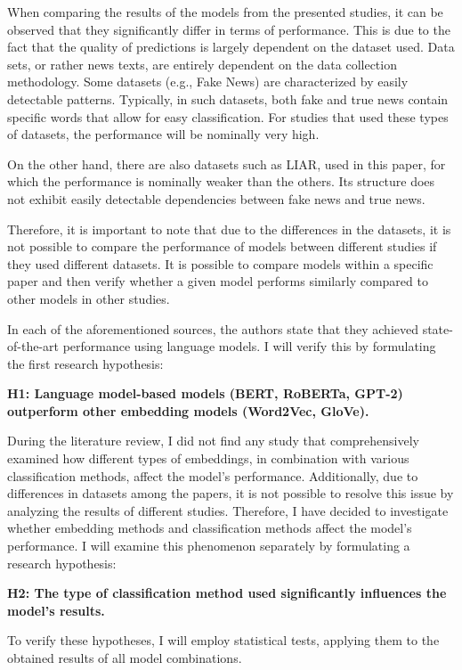 When comparing the results of the models from the presented studies, it can be observed that they significantly differ in terms of performance. This is due to the fact that the quality of predictions is largely dependent on the dataset used. Data sets, or rather news texts, are entirely dependent on the data collection methodology. Some datasets (e.g., Fake News) are characterized by easily detectable patterns. Typically, in such datasets, both fake and true news contain specific words that allow for easy classification. For studies that used these types of datasets, the performance will be nominally very high.

On the other hand, there are also datasets such as LIAR, used in this paper, for which the performance is nominally weaker than the others. Its structure does not exhibit easily detectable dependencies between fake news and true news.

Therefore, it is important to note that due to the differences in the datasets, it is not possible to compare the performance of models between different studies if they used different datasets. It is possible to compare models within a specific paper and then verify whether a given model performs similarly compared to other models in other studies.

In each of the aforementioned sources, the authors state that they achieved state-of-the-art performance using language models. I will verify this by formulating the first research hypothesis:
\vspace{0.2cm}

\noindent\textbf{H1: Language model-based models (BERT, RoBERTa, GPT-2) outperform other embedding models (Word2Vec, GloVe).}
\vspace{0.2cm}

During the literature review, I did not find any study that comprehensively examined how different types of embeddings, in combination with various classification methods, affect the model's performance. Additionally, due to differences in datasets among the papers, it is not possible to resolve this issue by analyzing the results of different studies. Therefore, I have decided to investigate whether embedding methods and classification methods affect the model's performance. I will examine this phenomenon separately by formulating a research hypothesis:
\vspace{0.2cm}

\noindent\textbf{H2: The type of classification method used significantly influences the model's results.}
\vspace{0.2cm}

To verify these hypotheses, I will employ statistical tests, applying them to the obtained results of all model combinations.